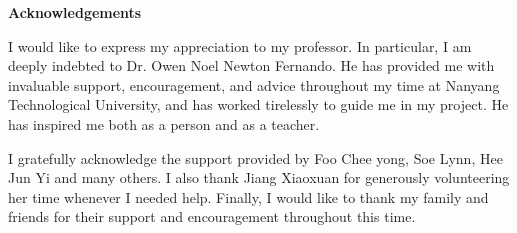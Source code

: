
\begin{center}
    \textbf{\Huge Acknowledgements}
\end{center}

I would like to express my appreciation to my professor. In particular, I am deeply indebted to Dr. Owen Noel Newton Fernando. He has provided me with invaluable support, encouragement, and advice throughout my time at Nanyang Technological University, and has worked tirelessly to guide me in my project. He has inspired me both as a person and as a teacher.

I gratefully acknowledge the support provided by Foo Chee yong, Soe Lynn, Hee Jun Yi and many others. I also thank Jiang Xiaoxuan for generously volunteering her time whenever I needed help. Finally, I would like to thank my family and friends for their support and encouragement throughout this time.
